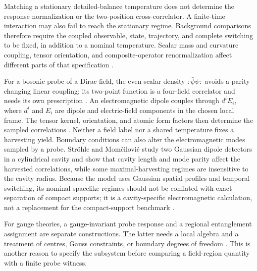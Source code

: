\documentclass[pdflatex,sn-mathphys-num]{sn-jnl}
\begin{document}
Matching a stationary detailed-balance temperature does not determine the response normalization or the two-position cross-correlator. A finite-time interaction may also fail to reach the stationary regime. Background comparisons therefore require the coupled observable, state, trajectory, and complete switching to be fixed, in addition to a nominal temperature. Scalar mass and curvature coupling, tensor orientation, and composite-operator renormalization affect different parts of that specification \cite{BukhariWang2024,CrispinoHiguchiMatsas2008}.

For a bosonic probe of a Dirac field, the even scalar density $:\bar\psi\psi:$ avoids a parity-changing linear coupling; its two-point function is a four-field correlator and needs its own prescription \cite{LoukoToussaint2016,DubeyKolekar2025}. An electromagnetic dipole couples through $d^iE_i$, where $d^i$ and $E_i$ are dipole and electric-field components in the chosen local frame. The tensor kernel, orientation, and atomic form factors then determine the sampled correlations \cite{PozasKerstjensEM2016}. Neither a field label nor a shared temperature fixes a harvesting yield. Boundary conditions can also alter the electromagnetic modes sampled by a probe. Ströhle and Momčilović study two Gaussian dipole detectors in a cylindrical cavity and show that cavity length and mode parity affect the harvested correlations, while some maximal-harvesting regimes are insensitive to the cavity radius. Because the model uses Gaussian spatial profiles and temporal switching, its nominal spacelike regimes should not be conflated with exact separation of compact supports; it is a cavity-specific electromagnetic calculation, not a replacement for the compact-support benchmark \cite{StrohleMomcilovic2026}.

For gauge theories, a gauge-invariant probe response and a regional entanglement assignment are separate constructions. The latter needs a local algebra and a treatment of centres, Gauss constraints, or boundary degrees of freedom \cite{CasiniHuertaRosabal2014,DonnellyFreidel2016}. This is another reason to specify the subsystem before comparing a field-region quantity with a finite probe witness.
\end{document}
